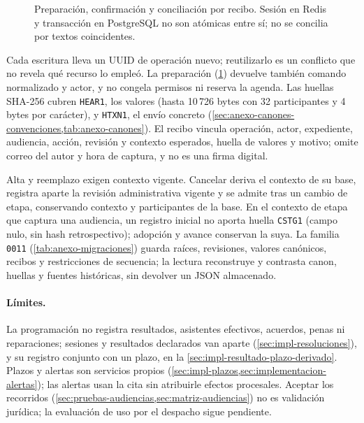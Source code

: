 \begin{figure}[!b]
  \centering
  
  \caption{Preparación, confirmación y conciliación por recibo. Sesión en Redis y transacción en PostgreSQL no son atómicas entre sí; no se concilia por textos coincidentes.}
  \label{fig:impl-audiencias-recibo}
\end{figure}

Cada escritura lleva un UUID de operación nuevo; reutilizarlo es un conflicto que no revela qué recurso lo empleó. La preparación (\cref{fig:impl-audiencias-recibo}) devuelve también comando normalizado y actor, y no congela permisos ni reserva la agenda. Las huellas SHA-256 cubren \texttt{HEAR1}, los valores (hasta 10\,726 bytes con 32 participantes y 4 bytes por carácter), y \texttt{HTXN1}, el envío concreto (\cref{sec:anexo-canones-convenciones,tab:anexo-canones}). El recibo vincula operación, actor, expediente, audiencia, acción, revisión y contexto esperados, huella de valores y motivo; omite correo del autor y hora de captura, y no es una firma digital.

Alta y reemplazo exigen contexto vigente. Cancelar deriva el contexto de su base, registra aparte la revisión administrativa vigente y se admite tras un cambio de etapa, conservando contexto y participantes de la base. En el contexto de etapa que captura una audiencia, un registro inicial no aporta huella \texttt{CSTG1} (campo nulo, sin hash retrospectivo); adopción y avance conservan la suya. La familia \texttt{0011} (\cref{tab:anexo-migraciones}) guarda raíces, revisiones, valores canónicos, recibos y restricciones de secuencia; la lectura reconstruye y contrasta canon, huellas y fuentes históricas, sin devolver un JSON almacenado.

\paragraph{Límites.} La programación no registra resultados, asistentes efectivos, acuerdos, penas ni reparaciones; sesiones y resultados declarados van aparte (\cref{sec:impl-resoluciones}), y su registro conjunto con un plazo, en la \cref{sec:impl-resultado-plazo-derivado}. Plazos y alertas son servicios propios (\cref{sec:impl-plazos,sec:implementacion-alertas}); las alertas usan la cita sin atribuirle efectos procesales. Aceptar los recorridos (\cref{sec:pruebas-audiencias,sec:matriz-audiencias}) no es validación jurídica; la evaluación de uso por el despacho sigue pendiente.

